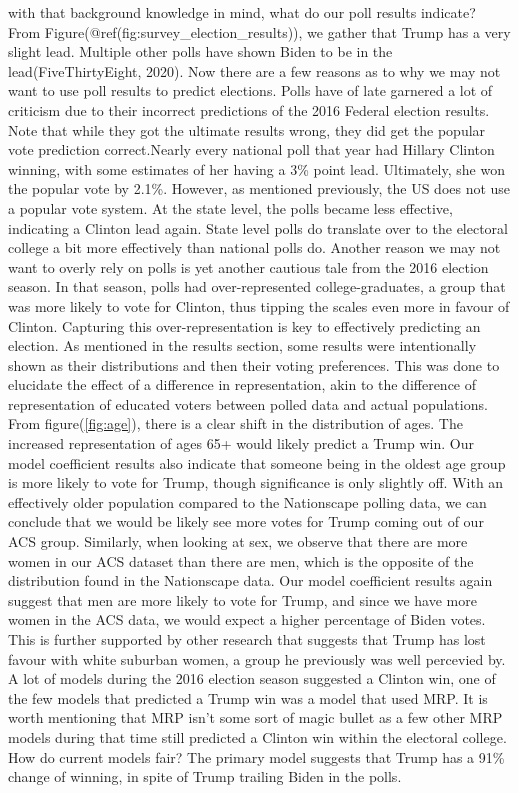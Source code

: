 \documentclass[
]{article}
\begin{document}
with that background knowledge in mind, what do our poll results indicate? From Figure(@ref(fig:survey\_election\_results)), we gather that Trump has a very slight lead. Multiple other polls have shown Biden to be in the lead(FiveThirtyEight, 2020). Now there are a few reasons as to why we may not want to use poll results to predict elections. Polls have of late garnered a lot of criticism due to their incorrect predictions of the 2016 Federal election results\citep{citeAapor}. Note that while they got the ultimate results wrong, they did get the popular vote prediction correct\citep{citeAapor}.Nearly every national poll that year had Hillary Clinton winning, with some estimates of her having a 3\% point lead\citep{citeAapor}. Ultimately, she won the popular vote by 2.1\%. However, as mentioned previously, the US does not use a popular vote system. At the state level, the polls became less effective, indicating a Clinton lead again\citep{citeAapor}. State level polls do translate over to the electoral college a bit more effectively than national polls do. Another reason we may not want to overly rely on polls is yet another cautious tale from the 2016 election season. In that season, polls had over-represented college-graduates, a group that was more likely to vote for Clinton, thus tipping the scales even more in favour of Clinton\citep{citeAapor}. Capturing this over-representation is key to effectively predicting an election. As mentioned in the results section, some results were intentionally shown as their distributions and then their voting preferences. This was done to elucidate the effect of a difference in representation, akin to the difference of representation of educated voters between polled data and actual populations.
From figure(\ref{fig:age}), there is a clear shift in the distribution of ages. The increased representation of ages 65+ would likely predict a Trump win. Our model coefficient results also indicate that someone being in the oldest age group is more likely to vote for Trump, though significance is only slightly off. With an effectively older population compared to the Nationscape polling data, we can conclude that we would be likely see more votes for Trump coming out of our ACS group. Similarly, when looking at sex, we observe that there are more women in our ACS dataset than there are men, which is the opposite of the distribution found in the Nationscape data. Our model coefficient results again suggest that men are more likely to vote for Trump, and since we have more women in the ACS data, we would expect a higher percentage of Biden votes. This is further supported by other research that suggests that Trump has lost favour with white suburban women, a group he previously was well percevied by\citep{conroy2020}. A lot of models during the 2016 election season suggested a Clinton win, one of the few models that predicted a Trump win was a model that used MRP\citep{2016election}. It is worth mentioning that MRP isn't some sort of magic bullet as a few other MRP models during that time still predicted a Clinton win within the electoral college\citep{2016election}. How do current models fair? The primary model suggests that Trump has a 91\% change of winning, in spite of Trump trailing Biden in the polls\citep{norpoth_2020}.
\end{document}
